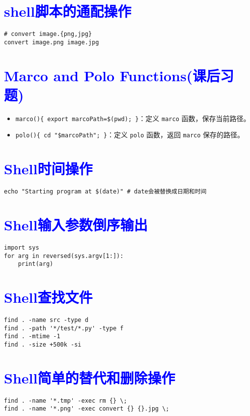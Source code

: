 \documentclass{article}
\begin{document}
\section{\textcolor{blue}{shell脚本的通配操作}}
\begin{lstlisting}  
# convert image.{png,jpg}   
convert image.png image.jpg  
\end{lstlisting}  
  
\section{\textcolor{blue}{Marco and Polo Functions(课后习题)}}
\begin{itemize}
    \item \texttt{marco()\{ export marcoPath=\$(pwd); \}}：定义 \texttt{marco} 函数，保存当前路径。
    \item \texttt{polo()\{ cd "\$marcoPath"; \}}：定义 \texttt{polo} 函数，返回 \texttt{marco} 保存的路径。
\end{itemize}
\section{\textcolor{blue}{Shell时间操作 }}
    \verb+echo "Starting program at $(date)" # date会被替换成日期和时间 + 
\section{\textcolor{blue}{Shell输入参数倒序输出}}
\begin{lstlisting}
import sys
for arg in reversed(sys.argv[1:]):
    print(arg)
\end{lstlisting}
\section{\textcolor{blue}{Shell查找文件}}
\begin{lstlisting}
find . -name src -type d
find . -path '*/test/*.py' -type f
find . -mtime -1
find . -size +500k -si
\end{lstlisting}
\section{\textcolor{blue}{Shell简单的替代和删除操作}}
\begin{lstlisting}
find . -name '*.tmp' -exec rm {} \;
find . -name '*.png' -exec convert {} {}.jpg \;
\end{lstlisting}
\end{document}
